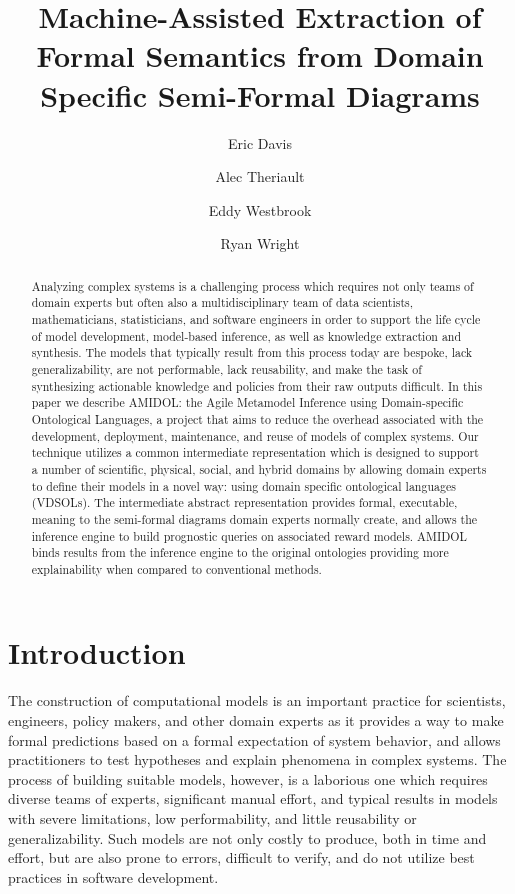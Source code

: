 \documentclass[11pt]{article}
\date{\vspace{-5ex}}
\author{Eric Davis}
\author{Alec Theriault}
\author{Eddy Westbrook}
\author{Ryan Wright}
\affil{Galois, Inc}
\title{Machine-Assisted Extraction of Formal Semantics from Domain Specific Semi-Formal Diagrams}
\newcommand{\amidol}{\textsc{AMIDOL}}
\begin{document}
\maketitle
\vspace{10pt}
\begin{abstract}
Analyzing complex systems is a challenging process which requires not only teams of domain experts but often also a multidisciplinary team of data scientists, mathematicians, statisticians, and software engineers in order to support the life cycle of model development, model-based inference, as well as knowledge extraction and synthesis.  The models that typically result from this process today are bespoke, lack generalizability, are not performable, lack reusability, and make the task of synthesizing actionable knowledge and policies from their raw outputs difficult.  In this paper we describe \amidol{}: the Agile Metamodel Inference using Domain-specific Ontological Languages, a project that aims to reduce the overhead associated with the development, deployment, maintenance, and reuse of models of complex systems.  Our technique utilizes a common intermediate representation which is designed to support a number of scientific, physical, social, and hybrid domains by allowing domain experts to define their models in a novel way: using domain specific ontological languages (VDSOLs).  The intermediate abstract representation provides formal, executable, meaning to the semi-formal diagrams domain experts normally create, and allows the inference engine to build prognostic queries on associated reward models.  \amidol{} binds results from the inference engine to the original ontologies providing more explainability when compared to conventional methods.
\end{abstract}

\section{Introduction}

The construction of computational models is an important practice for scientists, engineers, policy makers, and other domain experts as it provides a way to make formal predictions based on a formal expectation of system behavior, and allows practitioners to test hypotheses and explain phenomena in complex systems.  The process of building suitable models, however, is a laborious one which requires diverse teams of experts, significant manual effort, and typical results in models with severe limitations, low performability, and little reusability or generalizability.  Such models are not only costly to produce, both in time and effort, but are also prone to errors, difficult to verify, and do not utilize best practices in software development.
\end{document}
